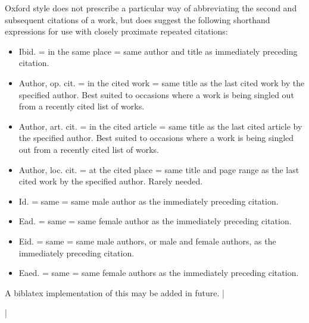\documentclass[extrafontsizes,11pt,a4paper,oneside]{memoir}
\begin{document}
Oxford style does not prescribe a particular way of abbreviating the second and subsequent citations of a work, but does suggest the following shorthand expressions for use with closely proximate repeated citations:

\begin{itemize}
  \item Ibid. = in the same place = same author and title as immediately preceding citation.
  \item Author, op. cit. = in the cited work = same title as the last cited work by the specified author. Best suited to occasions where a work is being singled out from a recently cited list of works. 
  \item Author, art. cit. = in the cited article = same title as the last cited article by the specified author. Best suited to occasions where a work is being singled out from a recently cited list of works.
  \item Author, loc. cit. = at the cited place = same title and page range as the last cited work by the specified author. Rarely needed.
  \item Id. = same = same male author as the immediately preceding citation.
  \item Ead. = same = same female author as the immediately preceding citation.
  \item Eid. = same = same male authors, or male and female authors, as the immediately preceding citation.
  \item Eaed. = same = same female authors as the immediately preceding citation.
\end{itemize}

A \textsf{biblatex} implementation of this may be added in future.
|


\todoc|
\printbibliography[notcategory=reviewed]
\end{document}
